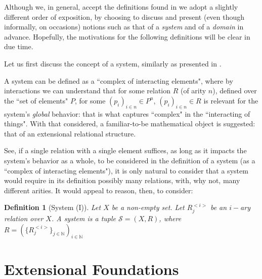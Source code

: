 \documentclass[11pt,a4paper]{article}
\newtheorem{definition}{Definition}[section]
\newcommand{\domain}{\mathcal{D}}
\begin{document}
Although we, in general, accept the definitions found in \citet{guarino2009} we adopt a slightly different order of exposition, by choosing to discuss and present (even though informally, on occasions) notions such as that of a \textit{system} and of a \textit{domain} in advance. Hopefully, the motivations for the following definitions will be clear in due time.

Let us first discuss the concept of a system, similarly as presented in \citet{bertalanffy1968}.

A system can be defined as a ``complex of interacting elements", where by interactions we can understand that for some relation $R$ (of arity $n$), defined over the ``set of elements" $P$, for some $(p_i)_{i \in n} \in P^n$, $(p_i)_{i \in n} \in R$ is relevant for the system's \textit{global} behavior: that is what captures ``complex" in the ``interacting of things". With that considered, a familiar-to-be mathematical object is suggested: that of an extensional relational structure.

See, if a single relation with a single element suffices, as long as it impacts the system's behavior as a whole, to be considered in the definition of a system (as a ``complex of interacting elements"), it is only natural to consider that a system would require in its definition possibly many relations, with, why not, many different arities. It would appeal to reason, then, to consider:

\begin{definition}[System (I)]
	Let $X$ be a non-empty set. Let $R^{<i>}_j$ be an $i-$ary relation over $X$. A \textit{system} is a tuple $\mathcal{S} = (X, R)$, where $R = (\{R^{<i>}_j\}_{j\in \mathbb{N}})_{i\in \mathbb{N}}$
%	 
\end{definition}


\section{Extensional Foundations}
\end{document}
